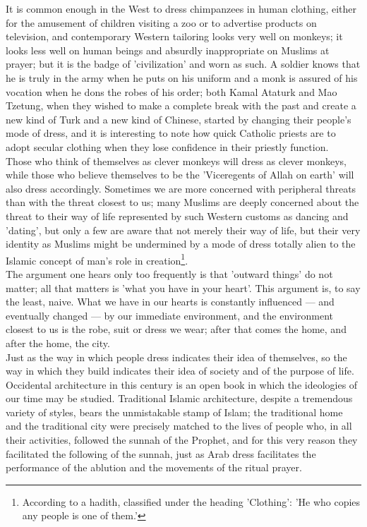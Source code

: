 \documentclass[11pt, b5paper, twoside]{book}
\begin{document}
It is common enough in the West to dress chimpanzees in human clothing, either for the amusement of 
children visiting a zoo or to advertise products on television, and contemporary Western tailoring 
looks very well on monkeys; it looks less well on human beings and absurdly inappropriate on Muslims 
at prayer; but it is the badge of 'civilization' and worn as such. A soldier knows that he is truly 
in the army when he puts on his uniform and a monk is assured of his vocation when he dons the robes 
of his order; both Kamal Ataturk and Mao Tzetung, when they wished to make a complete break with the 
past and create a new kind of Turk and a new kind of Chinese, started by changing their people's mode 
of dress, and it is interesting to note how quick Catholic priests are to adopt secular clothing when 
they lose confidence in their priestly function. \\

Those who think of themselves as clever monkeys will dress as clever monkeys, while those who believe 
themselves to be the 'Viceregents of Allah on earth' will also dress accordingly. Sometimes we are 
more concerned with peripheral threats than with the threat closest to us; many Muslims are deeply 
concerned about the threat to their way of life represented by such Western customs as dancing and 
'dating', but only a few are aware that not merely their way of life, but their very identity as 
Muslims might be undermined by a mode of dress totally alien to the Islamic concept of man's role in 
creation\footnote{According to a hadith, classified under the heading 'Clothing': 'He who copies any people is one of them.'}. \\

The argument one hears only too frequently is that 'outward things' do not matter; all that matters 
is 'what you have in your heart'. This argument is, to say the least, naive. What we have in our 
hearts is constantly influenced --- and eventually changed --- by our immediate environment, and the 
environment closest to us is the robe, suit or dress we wear; after that comes the home, and after 
the home, the city. \\

Just as the way in which people dress indicates their idea of themselves, so the way in which they 
build indicates their idea of society and of the purpose of life. Occidental architecture in this 
century is an open book in which the ideologies of our time may be studied. Traditional Islamic 
architecture, despite a tremendous variety of styles, bears the unmistakable stamp of Islam; the 
traditional home and the traditional city were precisely matched to the lives of people who, in all 
their activities, followed the sunnah of the Prophet, and for this very reason they facilitated the 
following of the sunnah, just as Arab dress facilitates the performance of the ablution and the 
movements of the ritual prayer. \\
\end{document}
